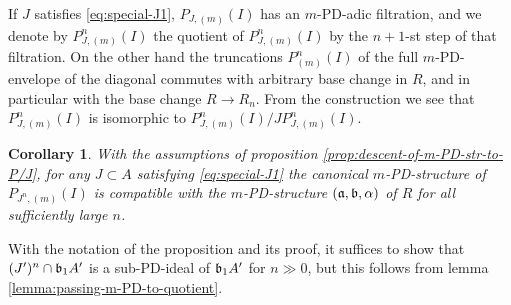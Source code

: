 \documentclass{article}
\theoremstyle{change}
\newtheorem{cor}[subsubsection]{Corollary}
\numberwithin{equation}{subsubsection}
\newcommand{\demobox}{\vrule height6pt width6pt depth0pt}
\newenvironment{demo}{\noindent{\it Proof.}}
{{\unskip\nobreak\hfil\qquad
\demobox\parfillskip=0pt\par}
\medskip}
\begin{document}
If $J$ satisfies \ref{eq:special-J1}, $P_{J,(m)}(I)$ has an
$m$-PD-adic filtration, and we denote by $P^n_{J,(m)}(I)$ the quotient
of $P^n_{J,(m)}(I)$ by the $n+1$-st step of that filtration.  On the
other hand the truncations $P^n_{(m)}(I)$ of the full $m$-PD-envelope
of the diagonal commutes with arbitrary base change in $R$, and in
particular with the base change $R\to R_n$. From the construction we
see that $P^n_{J,(m)}(I)$ is isomorphic to
$P^n_{J,(m)}(I)/JP^n_{J,(m)}(I)$.

\begin{cor}\label{cor:descent-of-m-PD-str-to-P/J^n}
  With the assumptions of proposition
  \ref{prop:descent-of-m-PD-str-to-P/J}, for any $J\subset A$
  satisfying \ref{eq:special-J1} the canonical $m$-PD-structure of
  $P_{J^n,(m)}(I)$ is compatible with the $m$-PD-structure
  $({\mathfrak a},{\mathfrak b},\alpha)$ of $R$ for all sufficiently large $n$.
\end{cor}
\begin{demo}
  With the notation of the proposition and its proof, it suffices to
  show that $(J')^n\cap{\mathfrak b}_1A'$ is a sub-PD-ideal of ${\mathfrak b}_1A'$ for
  $n\gg0$, but this follows from lemma
  \ref{lemma:passing-m-PD-to-quotient}. 
\end{demo}
\end{document}

